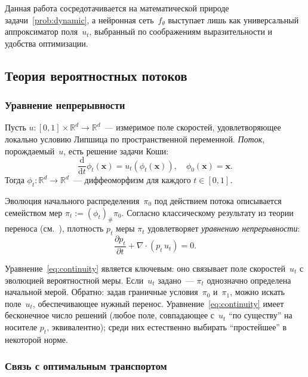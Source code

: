 Данная работа сосредотачивается на математической природе задачи~\ref{prob:dynamic}, а нейронная сеть~$f_\theta$ выступает лишь как универсальный аппроксиматор поля~$u_t$, выбранный по соображениям выразительности и удобства оптимизации.

\subsection{Теория вероятностных потоков}

\subsubsection{Уравнение непрерывности}

\begin{definition}
Пусть $u:[0,1]\times\mathbb{R}^d\to\mathbb{R}^d$~--- измеримое поле скоростей, удовлетворяющее локально условию Липшица по пространственной переменной. \emph{Поток}, порождаемый~$u$, есть решение задачи Коши:
\begin{equation}
    \frac{\mathrm{d}}{\mathrm{d}t}\phi_t(\mathbf{x}) = u_t(\phi_t(\mathbf{x})), \quad \phi_0(\mathbf{x}) = \mathbf{x}.
    \label{eq:ode_flow}
\end{equation}
Тогда $\phi_t:\mathbb{R}^d\to\mathbb{R}^d$~--- диффеоморфизм для каждого $t\in[0,1]$.
\end{definition}

Эволюция начального распределения~$\pi_0$ под действием потока описывается семейством мер $\pi_t := (\phi_t)_{\#}\pi_0$. Согласно классическому результату из теории переноса (см.~\cite[гл.~5]{villani2008optimal}), плотность $p_t$ меры $\pi_t$ удовлетворяет \emph{уравнению непрерывности}:
\begin{equation}
    \frac{\partial p_t}{\partial t} + \nabla\!\cdot(p_t\,u_t) = 0.
    \label{eq:continuity}
\end{equation}

Уравнение~\eqref{eq:continuity} является ключевым: оно связывает поле скоростей~$u_t$ с эволюцией вероятностной меры. Если~$u_t$ задано~--- $\pi_t$ однозначно определена начальной мерой. Обратно: задав граничные условия~$\pi_0$ и~$\pi_1$, можно искать поле~$u_t$, обеспечивающее нужный перенос. Уравнение~\eqref{eq:continuity} имеет бесконечное число решений (любое поле, совпадающее с~$u_t$ ``по существу'' на носителе $p_t$, эквивалентно); среди них естественно выбирать ``простейшее'' в некоторой норме.

\subsubsection{Связь с оптимальным транспортом}
\label{sec:ot_simple}

